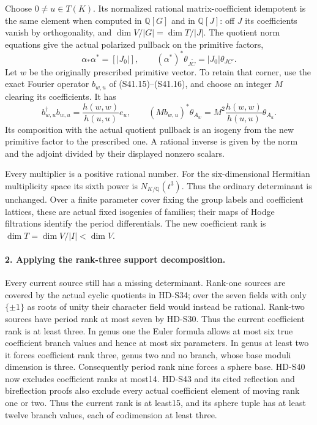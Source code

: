 Choose \(0\ne u\in T(K)\). Its normalized rational
matrix-coefficient idempotent is the same element when
computed in \(\mathbb Q[G]\) and in \(\mathbb Q[J]\):
off \(J\) its coefficients vanish by orthogonality, and
\(\dim V/|G|=\dim T/|J|\). The quotient norm equations
give the actual polarized pullback on the primitive factors,
\[
        \alpha_*\alpha^*=[|J_0|],\qquad
        (\alpha^*)^*\theta_{J\widetilde C}
                            =|J_0|\theta_{JC'}.            \tag{R15.3}
\]
Let \(w\) be the originally prescribed primitive vector.
To retain that corner, use the exact Fourier operator
\(b_{w,u}\) of (S41.15)--(S41.16), and choose an integer
\(M\) clearing its coefficients. It has
\[
       b_{w,u}^{\dagger}b_{w,u}
          =\frac{h(w,w)}{h(u,u)}e_u,
 \qquad
 (Mb_{w,u})^*\theta_{A_w}
          =M^2\frac{h(w,w)}{h(u,u)}\theta_{A_u}.            \tag{R15.4}
\]
Its composition with the actual quotient pullback is an
isogeny from the new primitive factor to the prescribed
one. A rational inverse is given by the norm and the
adjoint divided by their displayed nonzero scalars.

Every multiplier is a positive rational number. For the
six-dimensional Hermitian multiplicity space its sixth
power is \(N_{K/\mathbb Q}(t^3)\). Thus the ordinary
determinant is unchanged. Over a finite parameter cover
fixing the group labels and coefficient lattices, these
are actual fixed isogenies of families; their maps of
Hodge filtrations identify the period differentials.
The new coefficient rank is \(\dim T=\dim V/|I|<\dim V\).

\paragraph{2. Applying the rank-three support decomposition.}
Every current source still has a missing determinant.
Rank-one sources are covered by the actual cyclic
quotients in HD-S34; over the seven fields with only
\(\{\pm1\}\) as roots of unity their character field
would instead be rational. Rank-two sources have period
rank at most seven by HD-S30. Thus the current coefficient
rank is at least three. In genus one the Euler formula
allows at most six true coefficient branch values and
hence at most six parameters. In genus at least two it
forces coefficient rank three, genus two and no branch,
whose base moduli dimension is three. Consequently period
rank nine forces a sphere base. HD-S40 now excludes
coefficient ranks at most14. HD-S43 and its cited
reflection and bireflection proofs also exclude every
actual coefficient element of moving rank one or two.
Thus the current rank is at least15, and its sphere tuple
has at least twelve branch values, each of codimension
at least three.

